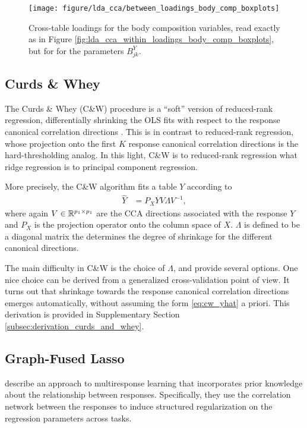 \documentclass[14pt]{extarticle}
\begin{document}
\begin{figure}
  \centering
  \texttt{[image: figure/lda\_cca/between\_loadings\_body\_comp\_boxplots]}
  \caption{Cross-table loadings for the body composition variables, read exactly
    as in Figure \ref{fig:lda_cca_within_loadings_body_comp_boxplots}, but for for the
    parameters
    $B^{Y}_{jk}$. \label{fig:lda_cca_between_loadings_body_comp_boxplots}}
\end{figure}

\subsection{Curds \& Whey}
\label{subsec:cw}

The Curds \& Whey (C\&W) procedure is a ``soft'' version of reduced-rank
regression, differentially shrinking the OLS fits with respect to the response
canonical correlation directions \citep{breiman1997predicting}. This is in
contrast to reduced-rank regression, whose projection onto the first $K$
response canonical correlation directions is the hard-thresholding analog. In
this light, C\&W is to reduced-rank regression what ridge regression is to
principal component regression.

More precisely, the C\&W algorithm fits a table $Y$ according to
\begin{align}
  \hat{Y} &= P_{X}YV\Lambda V^{-1}, \label{eq:cw_yhat}
\end{align}
where again $V \in \mathbb{R}^{p_{1} \times p_{1}}$ are the CCA directions
associated with the response $Y$ and $P_{X}$ is the projection operator onto the
column space of $X$. $\Lambda$ is defined to be a diagonal matrix the determines
the degree of shrinkage for the different canonical directions.

The main difficulty in C\&W is the choice of $\Lambda$, and
\citep{breiman1997predicting} provide several options. One nice choice can be
derived from a generalized cross-validation point of view. It turns out that
shrinkage towards the response canonical correlation directions emerges
automatically, without assuming the form \ref{eq:cw_yhat} a priori. This
derivation is provided in Supplementary Section
\ref{subsec:derivation_curds_and_whey}.

\subsection{Graph-Fused Lasso}
\label{subsec:graph_fused_lasso}

\citep{chen2010graph} describe an approach to multiresponse learning that
incorporates prior knowledge about the relationship between responses.
Specifically, they use the correlation network between the responses to induce
structured regularization on the regression parameters across tasks.
\end{document}
